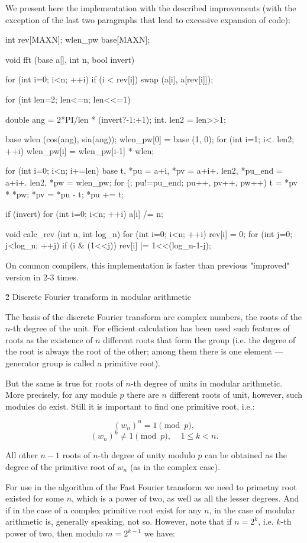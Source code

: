 We present here the implementation with the described improvements (with the exception of the last two paragraphs that lead to excessive expansion of code):

\code
int rev[MAXN];
wlen_pw base[MAXN];

void fft (base a[], int n, bool invert) {
for (int i=0; i<n; ++i)
if (i < rev[i])
swap (a[i], a[rev[i]]);

for (int len=2; len<=n; len<<=1) {
double ang = 2*PI/len * (invert?-1:+1);
int. len2 = len>>1;

base wlen (cos(ang), sin(ang));
wlen_pw[0] = base (1, 0);
for (int i=1; i<. len2; ++i)
wlen_pw[i] = wlen_pw[i-1] * wlen;

for (int i=0; i<n; i+=len) {
base t,
*pu = a+i,
*pv = a+i+. len2, 
*pu_end = a+i+. len2,
*pw = wlen_pw;
for (; pu!=pu_end; pu++, pv++, pw++) {
t = *pv * *pw;
*pv = *pu - t;
*pu += t;
}
}
}

if (invert)
for (int i=0; i<n; ++i)
a[i] /= n;
}

void calc_rev (int n, int log_n) {
for (int i=0; i<n; ++i) {
rev[i] = 0;
for (int j=0; j<log_n; ++j)
if (i & (1<<j))
rev[i] |= 1<<(log_n-1-j);
}
}
\endcode

On common compilers, this implementation is faster than previous "improved" version in 2-3 times.


\h2{ Discrete Fourier transform in modular arithmetic }

The basis of the discrete Fourier transform are complex numbers, the roots of the $n$-th degree of the unit. For efficient calculation has been used such features of roots as the existence of $n$ different roots that form the group (i.e. the degree of the root is always the root of the other; among them there is one element --- generator group is called a primitive root).

But the same is true for roots of $n$-th degree of units in modular arithmetic. More precisely, for any module $p$ there are $n$ different roots of unit, however, such modules do exist. Still it is important to find one primitive root, i.e.:

$$ (w_n)^n = 1 \pmod p, $$
$$ (w_n)^k \ne 1 {\pmod p}, ~~~~~ 1 \le k < n. $$

All other $n-1$ roots of $n$-th degree of unity modulo $p$ can be obtained as the degree of the primitive root of $w_n$ (as in the complex case).

For use in the algorithm of the Fast Fourier transform we need to primetny root existed for some $n$, which is a power of two, as well as all the lesser degrees. And if in the case of a complex primitive root exist for any $n$, in the case of modular arithmetic is, generally speaking, not so. However, note that if $n = 2^k$, i.e. $k$-th power of two, then modulo $m = 2^{k-1}$ we have:


